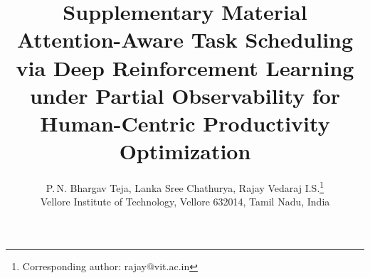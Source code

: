 \documentclass[11pt]{article}
\title{\textbf{Supplementary Material}\\[4pt]\large Attention-Aware Task Scheduling via Deep Reinforcement Learning under Partial Observability for Human-Centric Productivity Optimization}
\author{P.\,N. Bhargav Teja, Lanka Sree Chathurya, Rajay Vedaraj I.S.\thanks{Corresponding author: rajay@vit.ac.in}\\ Vellore Institute of Technology, Vellore 632014, Tamil Nadu, India}
\date{}
\begin{document}
\maketitle
\tableofcontents
\bigskip

\end{document}
